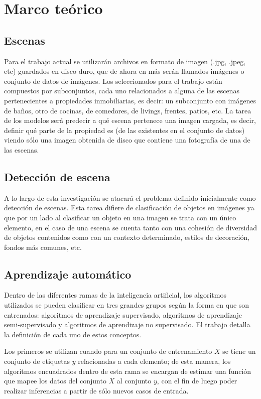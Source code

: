 \section{Marco teórico}\label{sec:marco_teorico}

\subsection{Escenas}
Para el trabajo actual se utilizarán archivos en formato de imagen (.jpg, .jpeg, etc) guardados en disco duro, que de ahora en más serán llamados imágenes o conjunto de datos de imágenes. Los seleccionados para el trabajo están compuestos por subconjuntos, cada uno relacionados a alguna de las escenas pertenecientes a propiedades inmobiliarias, es decir: un subconjunto con imágenes de baños, otro de cocinas, de comedores, de livings, frentes, patios, etc. La tarea de los modelos será predecir a qué escena pertenece una imagen cargada, es decir, definir qué parte de la propiedad es (de las existentes en el conjunto de datos) viendo sólo una imagen obtenida de disco que contiene una fotografía de una de las escenas. 

\subsection{Detección de escena}
A lo largo de esta investigación se atacará el problema definido inicialmente como detección de escenas. Esta tarea difiere de clasificación de objetos en imágenes ya que por un lado al clasificar un objeto en una imagen se trata con un único elemento, en el caso de una escena se cuenta tanto con una cohesión de diversidad de objetos contenidos como con un contexto determinado, estilos de decoración, fondos más comunes, etc.

\subsection{Aprendizaje automático}
 Dentro de las diferentes ramas de la inteligencia artificial, los algoritmos utilizados se pueden clasificar en tres grandes grupos según la forma en que son entrenados: algoritmos de aprendizaje supervisado, algoritmos de aprendizaje semi-supervisado y algoritmos de aprendizaje no supervisado. El trabajo \cite{zhu2009introduction} detalla la definición de cada uno de estos conceptos.
 
  Los primeros se utilizan cuando para un conjunto de entrenamiento \(X\) se tiene un conjunto de etiquetas \(y\) relacionadas a cada elemento; de esta manera, los algoritmos encuadrados dentro de esta rama se encargan de estimar una función que mapee los datos del conjunto \(X\) al conjunto \(y\), con el fin de luego poder realizar inferencias a partir de sólo nuevos casos de entrada.
 
